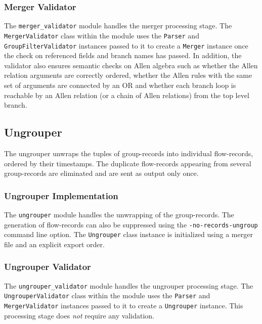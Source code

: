 \subsubsection{Merger Validator}\label{subsubsec:merger-validator}
The \texttt{merger\_validator} module handles the merger processing stage.
The \texttt{MergerValidator} class within the module uses the \texttt{Parser} and \texttt{GroupFilterValidator} instances passed to it to create a \texttt{Merger} instance once the check on referenced fields and branch names has passed. In addition, the validator also ensures semantic checks on Allen algebra such as whether the Allen relation arguments are correctly ordered, whether the Allen rules with the same set of arguments are connected by an OR and whether each branch loop is reachable by an Allen relation (or a chain of Allen relations) from the top level branch.

\subsection{Ungrouper}\label{subsec:ungrouper}
The ungrouper unwraps the tuples of group-records into individual flow-records, ordered by their timestamps. The duplicate flow-records appearing from several group-records are eliminated and are sent as output only once. 

\subsubsection{Ungrouper Implementation}\label{subsubsec:ungrouper-impl}
The \texttt{ungrouper} module handles the unwrapping of the group-records. The generation of flow-records can also be suppressed using the \texttt{-no-records-ungroup} command line option. The \texttt{Ungrouper} class instance is initialized using a merger file and an explicit export order.

\subsubsection{Ungrouper Validator}\label{subsubsec:ungrouper-validator}
The \texttt{ungrouper\_validator} module handles the ungrouper processing stage.
The \texttt{UngrouperValidator} class within the module uses the \texttt{Parser} and \texttt{MergerValidator} instances passed to it to create a \texttt{Ungrouper} instance. This processing stage does \emph{not} require any validation.